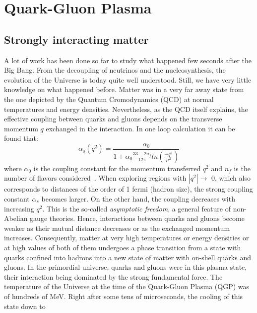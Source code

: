 
\chapter{Quark-Gluon Plasma} %

\label{Chapter1} %

\section{Strongly interacting matter}
A lot of work has been done so far to study what happened few seconds
after the Big Bang. From the decoupling of neutrinos 
and the nucleosynthesis, the evolution of the Universe is today quite well
understood. Still, we have very little knowledge on what happened before.
Matter was in a very far away state from the one depicted by the Quantum Cromodynamics (QCD) at normal temperatures and energy densities. 
Nevertheless, as the QCD itself explains, the effective coupling between quarks and gluons depends on the transverse momentum $q$ exchanged in the interaction. In one loop calculation it can be found that:
\begin{equation}
\alpha_s(q^2)=\frac{\alpha_0}{1+\alpha_0 \frac{33-2n_f}{12\pi}ln(\frac{-q^2}{\mu^2})}
\end{equation}
where $\alpha_0$ is the coupling constant for the momentum transferred $q^2$ and $n_f$ is the number of flavors considered~\cite{Wilson:1970ag}. When exploring regions with $|q^2|\rightarrow$ 0, which also corresponds to distances of the order of 1 fermi (hadron size), the strong coupling constant $\alpha_s$ becomes larger. On the other hand, the coupling decreases with increasing $q^2$. This is the so-called {\it asymptotic freedom}, a general feature of non-Abelian gauge theories. Hence, interactions between quarks and gluons become weaker as their mutual distance decreases or as the exchanged momentum increases.
Consequently, matter at very high temperatures or energy densities or at high values of both of them undergoes a phase transition from a state with quarks confined into hadrons into a new state of matter with on-shell quarks and gluons. 
In the primordial universe, quarks and gluons were in this plasma state, their interaction being dominated by the strong fundamental force.
The temperature of the Universe at the time of the Quark-Gluon Plasma (QGP) 
was of hundreds of MeV.
Right after some tens of microseconds, the cooling of this state down to 
